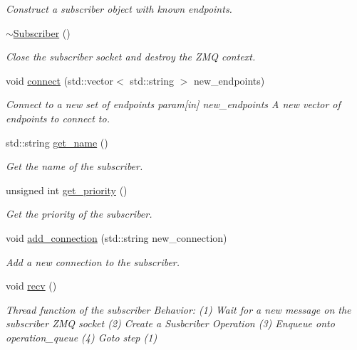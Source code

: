 \begin{DoxyCompactItemize}
\begin{DoxyCompactList}\small\item\em Construct a subscriber object with known endpoints. \end{DoxyCompactList}\item 
\hyperlink{classzcm_1_1Subscriber_a6f647c7d9f952e07b22b3aa4b63778e7}{$\sim$\-Subscriber} ()
\begin{DoxyCompactList}\small\item\em Close the subscriber socket and destroy the Z\-M\-Q context. \end{DoxyCompactList}\item 
void \hyperlink{classzcm_1_1Subscriber_a542674cff70f8d22b490a6b4a87476fe}{connect} (std\-::vector$<$ std\-::string $>$ new\-\_\-endpoints)
\begin{DoxyCompactList}\small\item\em Connect to a new set of endpoints param\mbox{[}in\mbox{]} new\-\_\-endpoints A new vector of endpoints to connect to. \end{DoxyCompactList}\item 
std\-::string \hyperlink{classzcm_1_1Subscriber_a013f450dff91644668a84cdb65d51b53}{get\-\_\-name} ()
\begin{DoxyCompactList}\small\item\em Get the name of the subscriber. \end{DoxyCompactList}\item 
unsigned int \hyperlink{classzcm_1_1Subscriber_a67427b093be45c979b4f091e6a9831ab}{get\-\_\-priority} ()
\begin{DoxyCompactList}\small\item\em Get the priority of the subscriber. \end{DoxyCompactList}\item 
void \hyperlink{classzcm_1_1Subscriber_acbfe7d4ab1b4a6fad5d9a7cbd3b8ee09}{add\-\_\-connection} (std\-::string new\-\_\-connection)
\begin{DoxyCompactList}\small\item\em Add a new connection to the subscriber. \end{DoxyCompactList}\item 
void \hyperlink{classzcm_1_1Subscriber_a3e270344beb730e009d48b04792e5526}{recv} ()
\begin{DoxyCompactList}\small\item\em Thread function of the subscriber Behavior\-: (1) Wait for a new message on the subscriber Z\-M\-Q socket (2) Create a Susbcriber Operation (3) Enqueue onto operation\-\_\-queue (4) Goto step (1) \end{DoxyCompactList}\item 

\end{DoxyCompactItemize}
